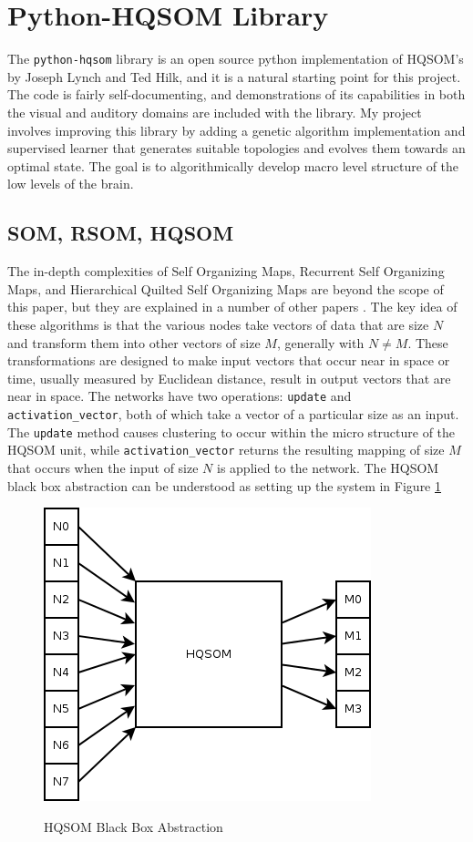 \documentclass[12pt,a4paper]{article}
\begin{document}
\section{Python-HQSOM Library}
The \texttt{python-hqsom} library is an open source python implementation of HQSOM's by Joseph Lynch and Ted Hilk, and it is a natural starting point for this project.  The code is fairly self-documenting, and demonstrations of its capabilities in both the visual and auditory domains are included with the library.  My project involves improving this library by adding a genetic algorithm implementation and supervised learner that generates suitable topologies and evolves them towards an optimal state.  The goal is to algorithmically develop macro level structure of the low levels of the brain.

\subsection{SOM, RSOM, HQSOM}
The in-depth complexities of Self Organizing Maps, Recurrent Self Organizing Maps, and Hierarchical Quilted Self Organizing Maps are beyond the scope of this paper, but they are explained in a number of other papers \cite{MLPaper} \cite{HQSOM}.  The key idea of these algorithms is that the various nodes take vectors of data that are size $N$ and transform them into other vectors of size $M$, generally with $N \neq M$.  These transformations are designed to make input vectors that occur near in space or time, usually measured by Euclidean distance, result in output vectors that are near in space.  The networks have two operations: \texttt{update} and \texttt{activation\_vector}, both of which take a vector of a particular size as an input.  The \texttt{update} method causes clustering to occur within the micro structure of the HQSOM unit, while \texttt{activation\_vector} returns the resulting mapping of size $M$ that occurs when the input of size $N$ is applied to the network.  The HQSOM black box abstraction can be understood as setting up the system in Figure \ref{fig:HQSOM}

\begin{figure}[H]
\caption{HQSOM Black Box Abstraction}
\centering
\includegraphics[scale=.5]{hqsom_black_box.png}
\label{fig:HQSOM}
\end{figure}
\end{document}
